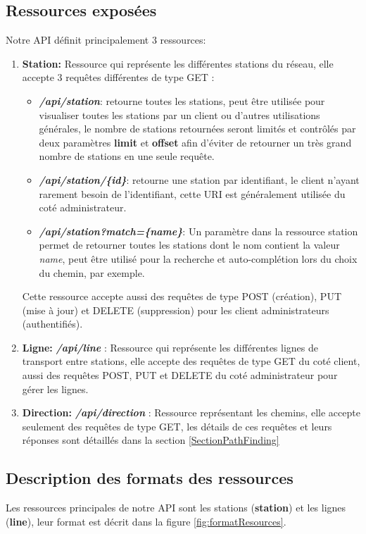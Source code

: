 \subsection{Ressources exposées}
Notre API définit principalement 3 ressources:
\begin{enumerate}
	\item \textbf{Station:} Ressource qui représente les différentes stations du réseau, elle accepte 3 requêtes différentes de type GET  : 
	      \begin{itemize}
	      	\item \emph{\textbf{/api/station}}: retourne toutes les stations, peut être utilisée pour visualiser toutes les stations par un client ou d'autres utilisations générales, le nombre de stations retournées seront limités et contrôlés par deux paramètres \textbf{limit} et \textbf{offset} afin d'éviter de retourner un très grand nombre de stations en une seule requête.
	      	\item \emph{\textbf{/api/station/\{id\}}}: retourne une station par identifiant, le client n'ayant rarement besoin de l'identifiant, cette URI est généralement utilisée du coté administrateur.
	      	\item \emph{\textbf{/api/station?match=\{name\}}}: Un paramètre dans la ressource station permet de retourner toutes les stations dont le nom contient la valeur \emph{name}, peut être utilisé pour la recherche et auto-complétion lors du choix du chemin, par exemple.
	      \end{itemize}
	      	      			
	      Cette ressource accepte aussi des requêtes de type POST (création), PUT (mise à jour) et DELETE (suppression)  pour les client administrateurs (authentifiés).
	\item \textbf{Ligne:} \emph{\textbf{/api/line}} : Ressource qui représente les différentes lignes de transport entre stations, elle accepte des requêtes de type GET du coté client, aussi des requêtes POST, PUT et DELETE du coté administrateur pour gérer les lignes.
	\item \textbf{Direction:}  \emph{\textbf{/api/direction}} : Ressource représentant les chemins, elle accepte seulement des requêtes de type GET, les détails de ces requêtes et leurs réponses sont détaillés dans la section \ref{SectionPathFinding}
\end{enumerate}
\subsection{Description des formats des ressources}
Les ressources principales de notre API sont les stations (\textbf{station}) et les lignes (\textbf{line}), leur format est décrit dans la figure \ref{fig:formatResources}.
\label{ref:resources}
\lstset{style=JSON}

